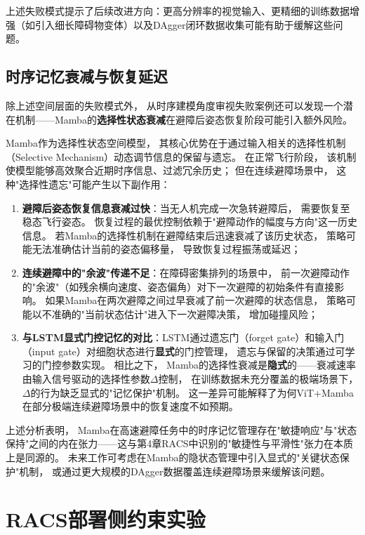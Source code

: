 上述失败模式提示了后续改进方向：更高分辨率的视觉输入、更精细的训练数据增强（如引入细长障碍物变体）以及DAgger闭环数据收集可能有助于缓解这些问题。

\subsection{时序记忆衰减与恢复延迟}

除上述空间层面的失败模式外，
从时序建模角度审视失败案例还可以发现一个潜在机制——Mamba的\textbf{选择性状态衰减}在避障后姿态恢复阶段可能引入额外风险。

Mamba作为选择性状态空间模型，
其核心优势在于通过输入相关的选择性机制（Selective Mechanism）动态调节信息的保留与遗忘\cite{Gu2023Mamba}。
在正常飞行阶段，
该机制使模型能够高效聚合近期时序信息、过滤冗余历史；
但在连续避障场景中，
这种"选择性遗忘"可能产生以下副作用：

\begin{enumerate}
  \item \textbf{避障后姿态恢复信息衰减过快}：当无人机完成一次急转避障后，
    需要恢复至稳态飞行姿态。
    恢复过程的最优控制依赖于"避障动作的幅度与方向"这一历史信息。
    若Mamba的选择性机制在避障结束后迅速衰减了该历史状态，
    策略可能无法准确估计当前的姿态偏移量，
    导致恢复过程振荡或延迟；
     \item \textbf{连续避障中的"余波"传递不足}：在障碍密集排列的场景中，
    前一次避障动作的"余波"（如残余横向速度、姿态偏角）对下一次避障的初始条件有直接影响。
    如果Mamba在两次避障之间过早衰减了前一次避障的状态信息，
    策略可能以不准确的"当前状态估计"进入下一次避障决策，
    增加碰撞风险；
     \item \textbf{与LSTM显式门控记忆的对比}：LSTM通过遗忘门（forget gate）和输入门（input gate）对细胞状态进行\textbf{显式}的门控管理，
    遗忘与保留的决策通过可学习的门控参数实现。
    相比之下，
    Mamba的选择性衰减是\textbf{隐式}的——衰减速率由输入信号驱动的选择性参数$\Delta$控制，
    在训练数据未充分覆盖的极端场景下，
    $\Delta$的行为缺乏显式的"记忆保护"机制。
    这一差异可能解释了为何ViT+Mamba在部分极端连续避障场景中的恢复速度不如预期。
     \end{enumerate}

上述分析表明，
Mamba在高速避障任务中的时序记忆管理存在"敏捷响应"与"状态保持"之间的内在张力——这与第4章RACS中识别的"敏捷性与平滑性"张力在本质上是同源的。
未来工作可考虑在Mamba的隐状态管理中引入显式的"关键状态保护"机制，
或通过更大规模的DAgger数据覆盖连续避障场景来缓解该问题。


\section{RACS部署侧约束实验}

